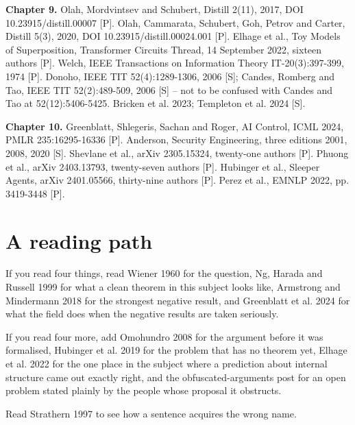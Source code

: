 \textbf{Chapter 9.} Olah, Mordvintsev and Schubert, Distill 2(11), 2017, DOI 10.23915/distill.00007 [P]. Olah, Cammarata, Schubert, Goh, Petrov and Carter, Distill 5(3), 2020, DOI 10.23915/distill.00024.001 [P]. Elhage et al., Toy Models of Superposition, Transformer Circuits Thread, 14 September 2022, sixteen authors [P]. Welch, IEEE Transactions on Information Theory IT-20(3):397-399, 1974 [P]. Donoho, IEEE TIT 52(4):1289-1306, 2006 [S]; Candes, Romberg and Tao, IEEE TIT 52(2):489-509, 2006 [S] -- not to be confused with Candes and Tao at 52(12):5406-5425. Bricken et al. 2023; Templeton et al. 2024 [S].

\textbf{Chapter 10.} Greenblatt, Shlegeris, Sachan and Roger, AI Control, ICML 2024, PMLR 235:16295-16336 [P]. Anderson, Security Engineering, three editions 2001, 2008, 2020 [S]. Shevlane et al., arXiv 2305.15324, twenty-one authors [P]. Phuong et al., arXiv 2403.13793, twenty-seven authors [P]. Hubinger et al., Sleeper Agents, arXiv 2401.05566, thirty-nine authors [P]. Perez et al., EMNLP 2022, pp. 3419-3448 [P].

\section*{A reading path}

If you read four things, read Wiener 1960 for the question, Ng, Harada and Russell 1999 for what a clean theorem in this subject looks like, Armstrong and Mindermann 2018 for the strongest negative result, and Greenblatt et al. 2024 for what the field does when the negative results are taken seriously.

If you read four more, add Omohundro 2008 for the argument before it was formalised, Hubinger et al. 2019 for the problem that has no theorem yet, Elhage et al. 2022 for the one place in the subject where a prediction about internal structure came out exactly right, and the obfuscated-arguments post for an open problem stated plainly by the people whose proposal it obstructs.

Read Strathern 1997 to see how a sentence acquires the wrong name.

